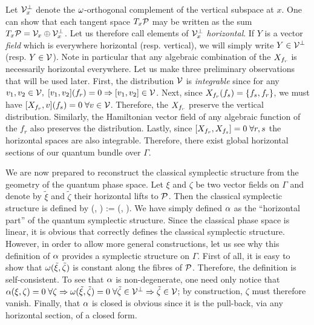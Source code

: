 Let ${\cal V}_x^\perp$ denote the $\w$-orthogonal complement of the
vertical subspace at $x$.  One can show \cite{thesis} that each
tangent space $T_x\P$ may be written as the sum $T_x\P = {\cal V}_x
\oplus {\cal V}_x^\perp$.  Let us therefore call elements of ${\cal
V}_x^\perp$ {\em horizontal}.  If $Y$ is a vector {\em field} which is
everywhere horizontal (resp. vertical), we will simply write $Y \in
{\cal V}^\perp$ (resp. $Y \in {\cal V}$).  Note in particular that any
algebraic combination of the $\hvf{f_r}$ is necessarily horizontal
everywhere.  Let us make three preliminary observations that will be
used later.  First, the distribution ${\cal V}$ is {\em integrable}
since for any $v_1, v_2 \in {\cal V}, \; [v_1, v_2](f_r)=0 \implies
[v_1, v_2] \in {\cal V}$.  Next, since $\hvf{f_r}(f_s) = \{f_s,
f_r\}$, we must have $[\hvf{f_r}, v](f_s) = 0 \; \forall v\in{\cal
V}$.  Therefore, the $\hvf{f_r}$ preserve the vertical distribution.
Similarly, the Hamiltonian vector field of any algebraic function of
the $f_r$ also preserves the distribution.  Lastly, since $[\hvf{f_r},
\hvf{f_s}] = 0 \; \forall r,s$ the horizontal spaces are also
integrable.  Therefore, there exist global horizontal sections of our
quantum bundle over $\Gamma$.

We are now prepared to reconstruct the classical symplectic structure
from the geometry of the quantum phase space.  Let $\xi$ and $\zeta$
be two vector fields on $\Gamma$ and denote by $\tilde{\xi}$ and
$\tilde{\zeta}$ their horizontal lifts to $\P$.  Then the classical
symplectic structure is defined by \be \label{omega_defined} \a(\xi,
\zeta) := \w(\tilde{\xi}, \tilde{\zeta}).  \ee We have simply defined
$\a$ as the ``horizontal part'' of the quantum symplectic structure.
Since the classical phase space is linear, it is obvious that
 correctly defines the classical symplectic
structure.  However, in order to allow more general constructions, let
us see why this definition of $\a$ provides a symplectic structure on
$\Gamma$.  First of all, it is easy to show that $\w(\tilde{\xi},
\tilde{\zeta})$ is constant along the fibres of $\P$.  Therefore, the
definition is self-consistent.  To see that $\a$ is non-degenerate,
one need only notice that $\a(\xi, \zeta)=0 \; \forall \zeta \implies
\w(\tilde{\xi}, \tilde{\zeta}) = 0 \; \forall \tilde{\zeta} \in {\cal
V}^\perp \implies \tilde{\zeta} \in {\cal V}$; by construction,
$\zeta$ must therefore vanish.  Finally, that $\a$ is closed is
obvious since it is the pull-back, via any horizontal section, of a
closed form.


